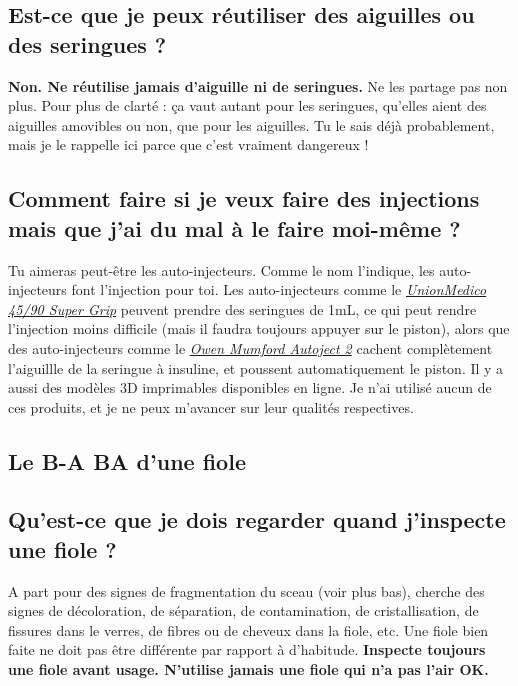\documentclass{article}
\begin{document}
\subsection{Est-ce que je peux réutiliser des aiguilles ou des seringues ?}

\textbf{Non. Ne réutilise jamais d'aiguille ni de seringues.} Ne les partage pas non plus. Pour plus de clarté : ça vaut autant pour les seringues, qu'elles aient des aiguilles amovibles ou non, que pour les aiguilles. Tu le sais déjà probablement, mais je le rappelle ici parce que c'est vraiment dangereux !

\subsection{Comment faire si je veux faire des injections mais que j'ai du mal à le faire moi-même ?}\label{5-21}

Tu aimeras peut-être les auto-injecteurs. Comme le nom l'indique, les auto-injecteurs font l'injection pour toi. Les auto-injecteurs comme le \href{https://unionmedico.com/90-super-grip/}{\textit{UnionMedico 45/90 Super Grip}} peuvent prendre des seringues de 1mL, ce qui peut rendre l'injection moins difficile (mais il faudra toujours appuyer sur le piston), alors que des auto-injecteurs comme le \href{https://www.youtube.com/watch?v=hPbhEpUN43Y}{\textit{Owen Mumford Autoject 2}} cachent complètement l'aiguillle de la seringue à insuline, et poussent automatiquement le piston. Il y a aussi des modèles 3D imprimables disponibles en ligne. Je n'ai utilisé aucun de ces produits, et je ne peux m'avancer sur leur qualités respectives.

\subsection*{Le B-A BA d'une fiole}

\subsection{Qu'est-ce que je dois regarder quand j'inspecte une fiole ?}

A part pour des signes de fragmentation du sceau (voir plus bas), cherche des signes de décoloration, de séparation, de contamination, de cristallisation, de fissures dans le verres, de fibres ou de cheveux dans la fiole, etc. Une fiole bien faite ne doit pas être différente par rapport à d'habitude. \textbf{Inspecte toujours une fiole avant usage. N'utilise jamais une fiole qui n'a pas l'air OK.} 
\end{document}
